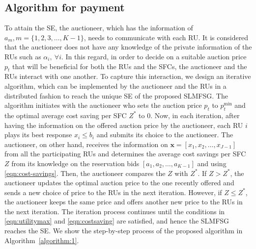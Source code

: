 \documentclass[journal,10pt]{IEEEtran}
\begin{document}
\subsection {Algorithm for payment}\label{sec:algorithm}
\hspace{1mm}To attain the SE, the auctioneer, which has the information of $a_m, m = \{1, 2, 3, \hdots, K-1\}$, needs to communicate with each RU. It is considered that the auctioneer does not have any knowledge of the private information of the RUs such as $\alpha_i,~\forall i$. In this regard, in order to decide on a suitable auction price $p_t$ that will be beneficial for both the RUs and the SFCs, the auctioneer and the RUs interact with one another. To capture this interaction, we design an iterative algorithm, which can be implemented by the auctioneer and the RUs in a distributed fashion to reach the unique SE of the proposed SLMFSG. The algorithm initiates with the auctioneer who sets the auction price $p_t$ to $p_t^\text{min}$ and the optimal average cost saving per SFC $Z^*$ to $0$. Now, in each iteration, after having the information on the offered auction price by the auctioneer, each RU $i$ plays its best response $x_i\leq b_i$ and submits its choice to the auctioneer. The auctioneer, on other hand, receives the information on $\mathbf{x} = [x_1, x_2, \hdots, x_{J-1}]$ from all the participating RUs and determines the average cost savings per SFC $Z$ from its knowledge on the reservation bids $[a_1, a_2, \hdots, a_{K-1}]$ and using \eqref{eqn:cost-savings}. Then, the auctioneer compares the $Z$ with $Z^*$. If $Z>Z^*$, the auctioneer updates the optimal auction price to the one recently offered and sends a new choice of price to the RUs in the next iteration. However, if $Z\leq Z^*$, the auctioneer keeps the same price and offers another new price to the RUs in the next iteration. The iteration process continues until the conditions in \eqref{eqn:utilitymax} and \eqref{eqn:costsaving} are satisfied, and hence the SLMFSG reaches the SE. We show the step-by-step process of the proposed algorithm in Algorithm~\ref{algorithm:1}.
\end{document}
